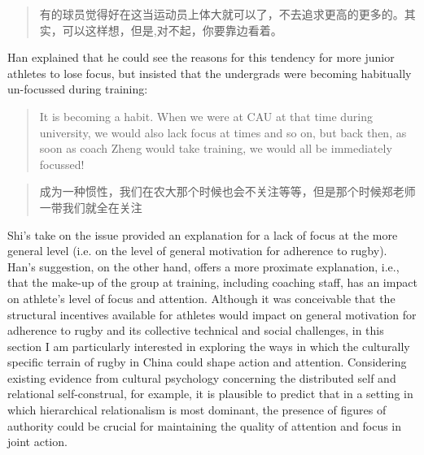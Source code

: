   \begin{quotation}
    有的球员觉得好在这当运动员上体大就可以了，不去追求更高的更多的。其实，可以这样想，但是,对不起，你要靠边看着。
  \end{quotation}

  Han explained that he could see the reasons for this tendency for more junior athletes to lose focus, but insisted that the undergrads were becoming habitually un-focussed during training:

  \begin{quotation}
    It is becoming a habit.  When we were at CAU at that time during university, we would also lack focus at times and so on, but back then, as soon as coach Zheng would take training, we would all be immediately focussed!
  \end{quotation}

  \begin{quotation}
      成为一种惯性，我们在农大那个时候也会不关注等等，但是那个时候郑老师一带我们就全在关注
  \end{quotation}

  Shi's take on the issue provided an explanation for a lack of focus at the more general level (i.e. on the level of general motivation for adherence to rugby).  Han's suggestion, on the other hand, offers a more proximate explanation, i.e., that the make-up of the group at training, including coaching staff, has an impact on athlete's level of focus and attention.  Although it was conceivable that the structural incentives available for athletes would impact on general motivation for adherence to rugby and its collective technical and social challenges, in this section I am particularly interested in exploring the ways in which the culturally specific terrain of rugby in China could shape action and attention.  Considering existing evidence from cultural psychology concerning the distributed self and relational self-construal, for example, it is plausible to predict that in a setting in which hierarchical relationalism is most dominant, the presence of figures of authority could be crucial for maintaining the quality of attention and focus in joint action.


